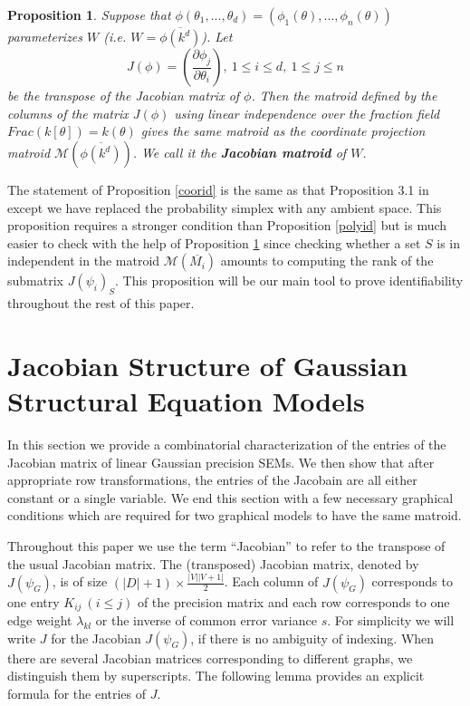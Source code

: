 \documentclass[12pt,reqno]{amsart}
\theoremstyle{plain}
\newtheorem{theorem}{Theorem}[section]
\newtheorem{proposition}[theorem]{Proposition}
\theoremstyle{definition}
\begin{document}


\begin{proposition}\label{jacmat}
\cite{rosen2014computing}
Suppose that $\phi(\theta_1,...,\theta_d)=(\phi_1(\theta),...,\phi_n(\theta))$ parameterizes $W$ (i.e. $W=\overline{\phi(k^d)}$). Let
$$
J(\phi)=\left(\frac{\partial\phi_j}{\partial\theta_i}\right),\ 1\leq i\leq d,\ 1\leq j\leq n
$$
be the transpose of the Jacobian matrix of $\phi$. Then the matroid defined by the columns of the matrix $J(\phi)$ using linear independence over the fraction field $Frac(k[\theta])=k(\theta)$ gives the same matroid as the coordinate projection matroid $\mathcal{M}(\overline{\phi(k^d)})$. We call it the \textbf{Jacobian matroid} of $W$.
\end{proposition}

The statement of Proposition \ref{coorid} is the same as that Proposition 3.1 in \cite{Seth19M} except we have replaced the probability simplex with any ambient space. This proposition requires a stronger condition than Proposition \ref{polyid} but is much easier to check with the help of Proposition \ref{jacmat} since checking whether a set $S$ is in independent in the matroid $\mathcal{M}(\overline{M_i})$ amounts to computing the rank of the submatrix $J(\psi_i)_S$. This proposition will be our main tool to prove identifiability throughout the rest of this paper. 


\section{Jacobian Structure of Gaussian Structural Equation Models} 
\label{sec:jac}
In this section we provide a combinatorial characterization of the entries of the Jacobian matrix of linear Gaussian precision SEMs. We then show that after appropriate row transformations, the entries of the Jacobain are all either constant or a single variable. We end this section with a few necessary graphical conditions which are required for two graphical models to have the same matroid. 

Throughout this paper we use the term ``Jacobian'' to refer to the transpose of the usual Jacobian matrix. The (transposed) Jacobian matrix, denoted by $J(\psi_G)$, is of size $(|D|+1)\times \frac{|V||V+1|}{2}$.  Each column of $J(\psi_G)$ corresponds to one entry $K_{ij}\ (i\leq j)$ of the precision matrix and each row corresponds to one edge weight $\lambda_{kl}$ or the inverse of common error variance $s$. For simplicity we will write $J$ for the Jacobian $J(\psi_G)$, if there is no ambiguity of indexing. When there are several Jacobian matrices corresponding to different graphs, we distinguish them by superscripts. The following lemma provides an explicit formula for the entries of $J$. 
\end{document}
